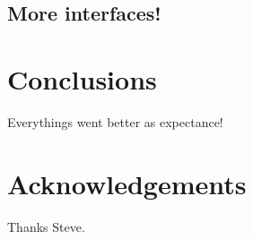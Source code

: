 \documentclass[final,3p,twocolumn,times]{elsarticle}
\begin{document}
%
%
%
%
%
%
%

\subsection{More interfaces!}
\label{subsec:more}

\section{Conclusions}
\label{sec:conclusion}

Everythings went better as expectance!

\section*{Acknowledgements}
\label{sec:acknowledgements}
Thanks Steve. 



\end{document}

